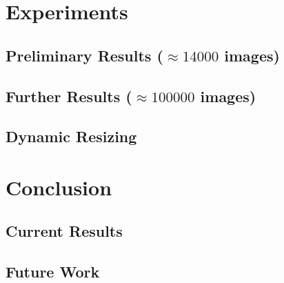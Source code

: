 \documentclass[11pt]{amsart}
\begin{document}
\section{Experiments}

\subsection{Preliminary Results ($\approx14000$ images)}

\subsection{Further Results ($\approx100000$ images)} 

\subsection{Dynamic Resizing}

\section{Conclusion}

\subsection{Current Results}

\subsection{Future Work}



\end{document}
